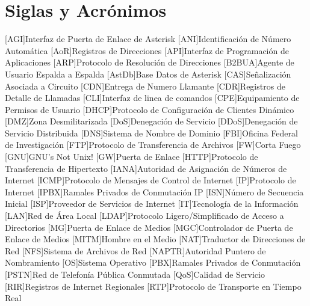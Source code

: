 \documentclass[a4paper,12pt]{report}
\begin{document}
\clearpage



\chapter*{Siglas y Acr\'onimos}

\begin{acronym}

[AGI]{Interfaz de Puerta de Enlace de Asterisk}
[ANI]{Identificación de Número Automática}
[AoR]{Registros de Direcciones}
[API]{Interfaz de Programación de Aplicaciones}
[ARP]{Protocolo de Resolución de Direcciones}
[B2BUA]{Agente de Usuario Espalda a Espalda}
[AstDb]{Base Datos de Asterisk}
[CAS]{Señalización Asociada a Circuito}
[CDN]{Entrega de Numero Llamante}
[CDR]{Registros de Detalle de Llamadas}
[CLI]{Interfaz de linea de comandos}
[CPE]{Equipamiento de Permisos de Usuario}
[DHCP]{Protocolo de Configuración de Clientes Dinámico}
[DMZ]{Zona Desmilitarizada}
[DoS]{Denegación de Servicio}
[DDoS]{Denegación de Servicio Distribuida}
[DNS]{Sistema de Nombre de Dominio}
[FBI]{Oficina Federal de Investigación}
[FTP]{Protocolo de Transferencia de Archivos}
[FW]{Corta Fuego}
[GNU]{GNU's Not Unix!}
[GW]{Puerta de Enlace}
[HTTP]{Protocolo de Transferencia de Hipertexto}
[IANA]{Autoridad de Asignación de Números de Internet}
[ICMP]{Protocolo de Mensajes de Control de Internet}
[IP]{Protocolo de Internet}
[IPBX]{Ramales Privados de Conmutación IP}
[ISN]{Número de Secuencia Inicial}
[ISP]{Proveedor de Servicios de Internet}
[IT]{Tecnología de la Información}
[LAN]{Red de Área Local}
[LDAP]{Protocolo Ligero/Simplificado de Acceso a Directorios}
[MG]{Puerta de Enlace de Medios}
[MGC]{Controlador de Puerta de Enlace de Medios}
[MITM]{Hombre en el Medio}
[NAT]{Traductor de Direcciones de Red}
[NFS]{Sistema de Archivos de Red}
[NAPTR]{Autoridad Puntero de Nombramiento} 
[OS]{Sistema Operativo}
[PBX]{Ramales Privados de Conmutación}
[PSTN]{Red de Telefonía Pública Conmutada}
[QoS]{Calidad de Servicio}
[RIR]{Registros de Internet Regionales}
[RTP]{Protocolo de Transporte en Tiempo Real}

\end{acronym}
\end{document}

